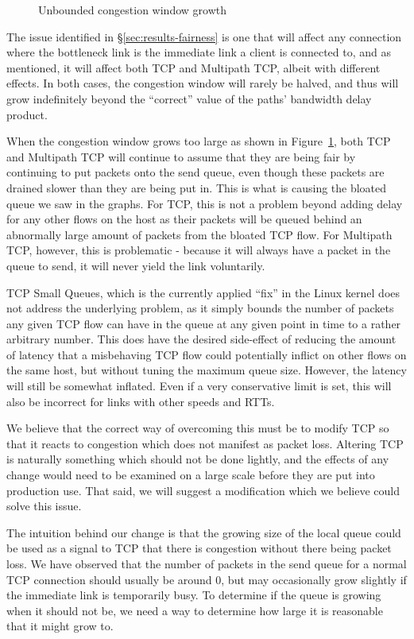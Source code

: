 \begin{figure}[h]
 \centering
 
 \caption{Unbounded congestion window growth}\label{graph:logarithmic}
\end{figure}

The issue identified in \S\ref{sec:results-fairness} is one that will affect any
connection where the bottleneck link is the immediate link a client is connected
to, and as mentioned, it will affect both TCP and Multipath TCP, albeit with
different effects. In both cases, the congestion window will rarely be halved,
and thus will grow indefinitely beyond the ``correct'' value of the paths'
bandwidth delay product.

When the congestion window grows too large as shown in
Figure~\ref{graph:logarithmic}, both TCP and Multipath TCP will continue to
assume that they are being fair by continuing to put packets onto the send
queue, even though these packets are drained slower than they are being put in.
This is what is causing the bloated queue we saw in the graphs. For TCP, this is
not a problem beyond adding delay for any other flows on the host as their
packets will be queued behind an abnormally large amount of packets from the
bloated TCP flow. For Multipath TCP, however, this is problematic - because it
will always have a packet in the queue to send, it will never yield the link
voluntarily.

TCP Small Queues, which is the currently applied ``fix'' in the Linux kernel
does not address the underlying problem, as it simply bounds the number of
packets any given TCP flow can have in the queue at any given point in time to a
rather arbitrary number. This does have the desired side-effect of reducing the
amount of latency that a misbehaving TCP flow could potentially inflict on other
flows on the same host, but without tuning the maximum queue size. However, the
latency will still be somewhat inflated. Even if a very conservative limit is
set, this will also be incorrect for links with other speeds and RTTs.

We believe that the correct way of overcoming this must be to modify TCP so that
it reacts to congestion which does not manifest as packet loss. Altering TCP is
naturally something which should not be done lightly, and the effects of any
change would need to be examined on a large scale before they are put into
production use. That said, we will suggest a modification which we believe could
solve this issue.

The intuition behind our change is that the growing size of the local queue
could be used as a signal to TCP that there is congestion without there being
packet loss. We have observed that the number of packets in the send queue for a
normal TCP connection should usually be around 0, but may occasionally grow
slightly if the immediate link is temporarily busy. To determine if the queue is
growing when it should not be, we need a way to determine how large it is
reasonable that it might grow to.

